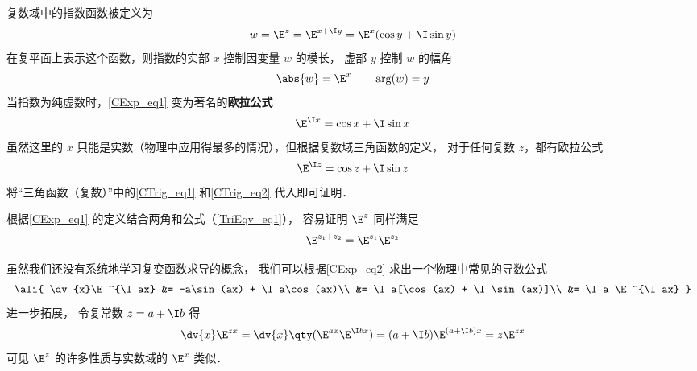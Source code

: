 

复数域中的指数函数被定义为
 \begin{equation}\label{CExp_eq1}
w = {\E^z} = {\E^{x + \I y}} = {\E^x}(\cos y + \I\sin y)
\end{equation}
在复平面上表示这个函数，则指数的实部 $x$ 控制因变量 $w$ 的模长， 虚部 $y$ 控制 $w$ 的幅角
 \begin{equation}
\abs{w} = {\E^x} \qquad \arg(w) = y
\end{equation}
当指数为纯虚数时，\autoref{CExp_eq1} 变为著名的\textbf{欧拉公式}
\begin{equation}\label{CExp_eq2}
{\E^{\I x}} = {\cos x + \I\sin x}
\end{equation}
虽然这里的 $x$ 只能是实数（物理中应用得最多的情况），但根据复数域三角函数的定义， 对于任何复数 $z$，都有欧拉公式
\begin{equation}
{\E^{\I z}} = {\cos z + \I\sin z}
\end{equation}
将“三角函数（复数）”中的\autoref{CTrig_eq1} 和\autoref{CTrig_eq2} 代入即可证明．

根据\autoref{CExp_eq1} 的定义结合两角和公式（\autoref{TriEqv_eq1}）， 容易证明 $\E^z$ 同样满足
\begin{equation}
\E^{z_1 + z_2} = \E^{z_1}\E^{z_2}
\end{equation}

虽然我们还没有系统地学习复变函数求导的概念， 我们可以根据\autoref{CExp_eq2} 求出一个物理中常见的导数公式
\begin{equation}\ali{
\dv{x}\E^{\I ax} &= -a\sin(ax) + \I a\cos(ax)\\
&= \I a[\cos(ax) + \I \sin(ax)]\\
&= \I a \E^{\I ax}
}\end{equation}
进一步拓展， 令复常数 $z = a + \I b$ 得
\begin{equation}
\dv{x}\E^{z x} = \dv{x} \qty(\E^{ax}\E^{\I bx}) = (a + \I b)\E^{(a+\I b)x} = z\E^{zx}
\end{equation}
可见 $\E^z$ 的许多性质与实数域的 $\E^x$ 类似．


